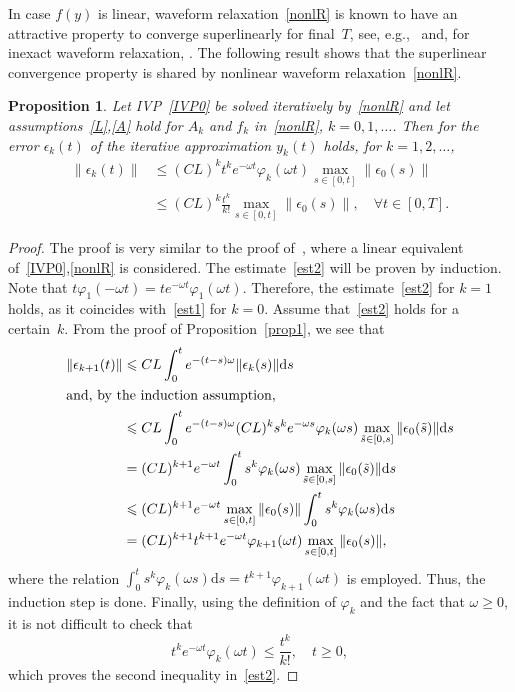 \documentclass[sn-aps]{sn-jnl}
\theoremstyle{thmstyleone}%
\newtheorem{proposition}[theorem]{Proposition}%
\theoremstyle{thmstyletwo}%
\theoremstyle{thmstylethree}%
\newcommand{\dd}{\mathrm{d}}
\newcommand{\geqs}{\geqslant}
\newcommand{\leqs}{\leqslant}
\begin{document}
\medskip

In case $f(y)$ is linear, waveform relaxation~\eqref{nonlR} is known
to have an attractive property to converge superlinearly for 
final~$T$, see, e.g.,~\cite[Theorem~5.1]{BGH13} 
and, for inexact waveform relaxation, \cite[Theorem~2]{BotchevOseledetsTyrtyshnikov2014}.
The following result shows that the superlinear convergence property 
is shared by nonlinear waveform relaxation~\eqref{nonlR}.

\begin{proposition}
\label{prop2}
Let IVP~\eqref{IVP0} be solved iteratively by~\eqref{nonlR} and let 
assumptions~\eqref{L},\eqref{A} hold for $A_k$ and $f_k$ in~\eqref{nonlR}, $k=0,1,\dots$.
Then for the error $\epsilon_k(t)$ %
of the iterative approximation $y_k(t)$ holds, for $k=1,2,\dots$,
\begin{equation}
\label{est2}
\begin{aligned}
\|\epsilon_k(t)\| &\leqs (C L)^k t^k e^{-\omega t} \varphi_k(\omega t)
\max_{s\in[0,t]} \|\epsilon_0(s)\|
\\
&\leqs (C L)^k \frac{t^k}{k !} 
\max_{s\in[0,t]} \|\epsilon_0(s)\|, \quad \forall t\in[0,T].
\end{aligned}
\end{equation}
\end{proposition}
 
\begin{proof}
The proof is very similar to the proof of~\cite[Theorem~5.1]{BGH13}, where 
a linear equivalent of~\eqref{IVP0},\eqref{nonlR} is considered.
The estimate~\eqref{est2} will be proven by induction.
Note that $t\varphi_1(-\omega t)= te^{-\omega t}\varphi_1(\omega t)$.
Therefore, the estimate~\eqref{est2} for $k=1$ holds, as it coincides 
with~\eqref{est1} for $k=0$.
Assume that~\eqref{est2} holds for a certain~$k$.
From the proof of Proposition~\ref{prop1}, we see that
\begin{align*}
\|\epsilon_{k+1}(t)\| &\leqs C L \int_0^t e^{-(t-s)\omega}\|\epsilon_{k}(s)\|\dd s
\\
\intertext{and, by the induction assumption,}
&\leqs
C L \int_0^t e^{-(t-s)\omega}(C L)^k s^k e^{-\omega s} \varphi_k(\omega s)
\max_{\tilde{s}\in[0,s]} \|\epsilon_0(\tilde{s})\|\dd s
\\
&=
(C L)^{k+1} e^{-\omega t} \int_0^t s^k \varphi_k(\omega s)
\max_{\tilde{s}\in[0,s]} \|\epsilon_0(\tilde{s})\|\dd s
\\
&\leqs
(C L)^{k+1} e^{-\omega t} \max_{s\in[0,t]} \|\epsilon_0(s)\|
\int_0^t s^k \varphi_k(\omega s)\dd s 
\\
&=
(C L)^{k+1} t^{k+1} e^{-\omega t} \varphi_{k+1}(\omega t) 
\max_{s\in[0,t]} \|\epsilon_0(s)\|,
\end{align*}
where the relation 
$\int_0^t s^k \varphi_k(\omega s)\dd s = t^{k+1} \varphi_{k+1}(\omega t)$
is employed.
Thus, the induction step is done.
Finally, using the definition of $\varphi_k$ and the fact
that $\omega\geqs 0$, it is not difficult to check that 
$$
t^k e^{-\omega t}\varphi_k(\omega t) \leqs \frac{t^k}{k!},
\quad t\geqs 0,
$$
which proves the second inequality in~\eqref{est2}.
\end{proof}
\end{document}
